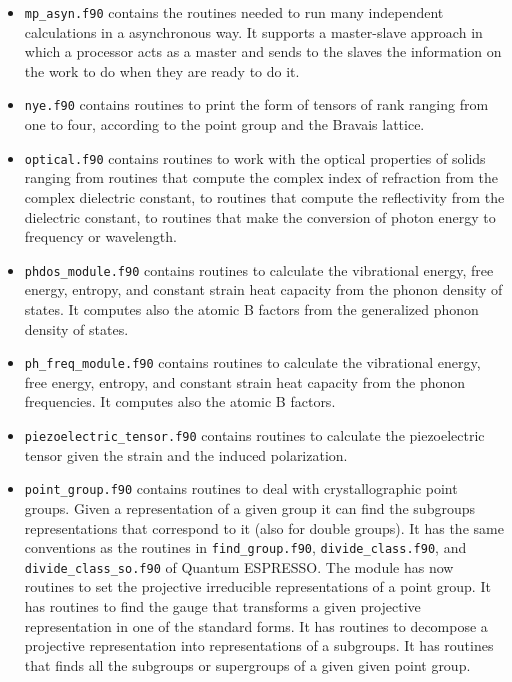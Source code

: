 \documentclass[12pt,a4paper,twoside]{report}
\def\qe{{\sc Quantum ESPRESSO}}
\begin{document}
\begin{itemize}
\item
\texttt{mp\_asyn.f90} contains the routines needed to run many 
independent calculations in a asynchronous way. It supports a master-slave
approach in which a processor acts as a master and sends to the slaves
the information on the work to do when they are ready to do it.

\item
\texttt{nye.f90} contains routines to print the form of tensors of
rank ranging from one to four, according to the point group and the
Bravais lattice.

\item
\texttt{optical.f90} contains routines to work with the optical properties
of solids ranging from routines that compute the complex index of refraction
from the complex dielectric constant, to routines that compute the
reflectivity from the dielectric constant, to routines that make
the conversion of photon energy to frequency or wavelength.

\item
\texttt{phdos\_module.f90} contains routines to calculate the vibrational
energy, free energy, entropy, and constant strain heat capacity from the
phonon density of states. It computes also the atomic B factors from the
generalized phonon density of states.

\item
\texttt{ph\_freq\_module.f90} contains routines to calculate the vibrational
energy, free energy, entropy, and constant strain heat capacity from the
phonon frequencies. It computes also the atomic B factors.

\item
\texttt{piezoelectric\_tensor.f90} contains routines to calculate the
piezoelectric tensor given the strain and the induced polarization.

\item
\texttt{point\_group.f90} contains routines to deal with crystallographic
point groups. Given a representation of a given group it can find 
the subgroups representations that correspond to it (also for
double groups). It has the same conventions as the routines 
in \texttt{find\_group.f90}, \texttt{divide\_class.f90}, and 
\texttt{divide\_class\_so.f90} of \qe. The module has now routines to
set the projective irreducible representations of a point group.
It has routines to find the gauge that transforms a given projective
representation in one of the standard forms. It has routines to decompose
a projective representation into representations of a subgroups.
It has routines that finds all the subgroups or supergroups of a given given
point group.


\end{itemize}
\end{document}
